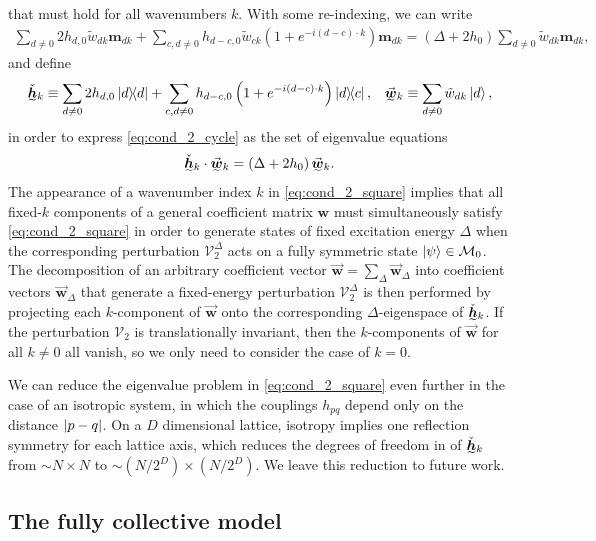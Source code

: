 \documentclass[nofootinbib,notitlepage,11pt]{revtex4-2}
\newcommand{\p}[1]{\left(#1\right)} %
\renewcommand{\c}{\cdot} %
\newcommand{\m}{\bm} %
\renewcommand{\v}{\vec} %
\newcommand{\1}{\mathds{1}}
\newcommand{\M}{\mathcal{M}}
\newcommand{\V}{\mathcal{V}}
\newcommand{\ut}{\undertilde}
\begin{document}
that must hold for all wavenumbers $k$.  With some re-indexing, we can
write
\begin{align}
  \sum_{d\ne0} 2 h_{d,0} \tilde w_{dk} \m m_{dk}
  + \sum_{c,d\ne0} h_{d-c,0} \tilde w_{ck}
  \p{1 + e^{-i\p{d-c}\c k}} \m m_{dk}
  = \p{\Delta + 2 h_0} \sum_{d\ne0} \tilde w_{dk} \m m_{dk},
  \label{eq:cond_2_cycle}
\end{align}
and define
\begin{align}
  \ut{\check{\m h}}_k
  \equiv \sum_{d\ne0} 2 h_{d,0} \op{d}
  + \sum_{c,d\ne0} h_{d-c,0} \p{1+e^{-i\p{d-c}\c k}} \op{d}{c},
  &&
  \ut{\v{\m w}}_k \equiv \sum_{d\ne0} \tilde w_{dk} \ket{d},
\end{align}
in order to express \eqref{eq:cond_2_cycle} as the set of eigenvalue
equations
\begin{align}
  \ut{\check{\m h}}_k \c \ut{\v{\m w}}_k
  = \p{\Delta + 2 h_0} \ut{\v{\m w}}_k.
  \label{eq:cond_2_square}
\end{align}
The appearance of a wavenumber index $k$ in \eqref{eq:cond_2_square}
implies that all fixed-$k$ components of a general coefficient matrix
$\m w$ must simultaneously satisfy \eqref{eq:cond_2_square} in order
to generate states of fixed excitation energy $\Delta$ when the
corresponding perturbation $\V_2^\Delta$ acts on a fully symmetric
state $\ket\psi\in\M_0$.  The decomposition of an arbitrary
coefficient vector $\v{\m w}=\sum_\Delta\v{\m w}_\Delta$ into
coefficient vectors $\v{\m w}_\Delta$ that generate a fixed-energy
perturbation $\V_2^\Delta$ is then performed by projecting each
$k$-component of $\v{\m w}$ onto the corresponding $\Delta$-eigenspace
of $\ut{\check{\m h}}_k$.  If the perturbation $\V_2$ is
translationally invariant, then the $k$-components of $\v{\m w}$ for
all $k\ne 0$ all vanish, so we only need to consider the case of
$k=0$.

We can reduce the eigenvalue problem in \eqref{eq:cond_2_square} even
further in the case of an isotropic system, in which the couplings
$h_{pq}$ depend only on the distance $\abs{p-q}$.  On a $D$
dimensional lattice, isotropy implies one reflection symmetry for each
lattice axis, which reduces the degrees of freedom in of
$\ut{\check{\m h}}_k$ from $\sim N\times N$ to
$\sim\p{N/2^D}\times\p{N/2^D}$.  We leave this reduction to future
work.

\subsection{The fully collective model}
\end{document}
